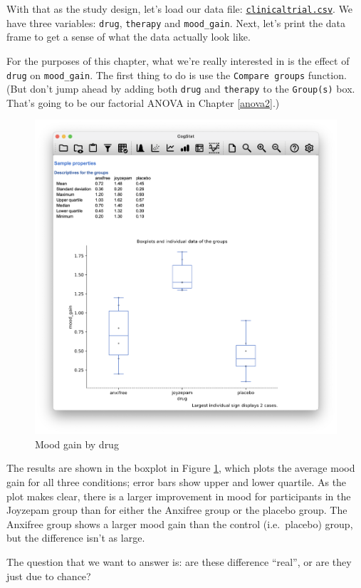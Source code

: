 \documentclass[
]{book}
\theoremstyle{definition}
\theoremstyle{definition}
\theoremstyle{definition}
\theoremstyle{definition}
\theoremstyle{remark}
\begin{document}
With that as the study design, let's load our data file: \href{resources/data/clinicaltrial.csv}{\texttt{clinicaltrial.csv}}. We have three variables: \texttt{drug}, \texttt{therapy} and \texttt{mood\_gain}. Next, let's print the data frame to get a sense of what the data actually look like.

For the purposes of this chapter, what we're really interested in is the effect of \texttt{drug} on \texttt{mood\_gain}. The first thing to do is use the \texttt{Compare\ groups} function. (But don't jump ahead by adding both \texttt{drug} and \texttt{therapy} to the \texttt{Group(s)} box. That's going to be our factorial ANOVA in Chapter \ref{anova2}.)

\begin{figure}

{\centering \includegraphics[width=0.66\linewidth]{resources/image/moodbydrug} 

}

\caption{Mood gain by drug}\label{fig:moodbydrug}
\end{figure}

The results are shown in the boxplot in Figure \ref{fig:moodbydrug}, which plots the average mood gain for all three conditions; error bars show upper and lower quartile. As the plot makes clear, there is a larger improvement in mood for participants in the Joyzepam group than for either the Anxifree group or the placebo group. The Anxifree group shows a larger mood gain than the control (i.e.~placebo) group, but the difference isn't as large.

The question that we want to answer is: are these difference ``real'', or are they just due to chance?
\end{document}
